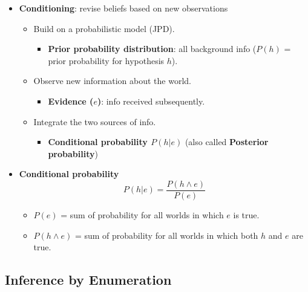 \documentclass{article}
\begin{document}
\begin{itemize}
    \item \textbf{Conditioning}: revise beliefs based on new observations
        \begin{itemize}
            \item Build on a probabilistic model (JPD).
                \begin{itemize}
                    \item \textbf{Prior probability distribution}: all background info ($P(h)$ = prior probability for hypothesis $h$).
                \end{itemize}
            \item Observe new information about the world.
                \begin{itemize}
                    \item \textbf{Evidence ($e$)}: info received subsequently.
                \end{itemize}
            \item Integrate the two sources of info.
                \begin{itemize}
                    \item \textbf{Conditional probability $P(h|e)$} (also called \textbf{Posterior probability})
                \end{itemize}
        \end{itemize}
    \item \textbf{Conditional probability}
        \begin{equation*}
            P(h|e) = \frac{P(h \wedge e)}{P(e)}
        \end{equation*}
        \begin{itemize}
            \item $P(e)$ = sum of probability for all worlds in which $e$ is true.
            \item $P(h \wedge e)$ = sum of probability for all worlds in which both $h$ and $e$ are true.
        \end{itemize}
\end{itemize}

\subsection{Inference by Enumeration}
\end{document}
